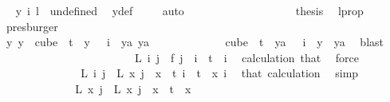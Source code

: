 \begin{isabellebody}
\ \isamarkupfalse%
\ {\isachardoublequoteopen}y\ i\ l\ {\isacharequal}{\kern0pt}\ undefined{\isachardoublequoteclose}\ \isamarkupfalse%
\ y{\isacharunderscore}{\kern0pt}def\ \isamarkupfalse%
\ {}\ \isamarkupfalse%
\ auto\isanewline
\ \ \ \ \ \ \ \ \ \ \ \ \ \ \ \ \isamarkupfalse%
\ \isamarkupfalse%
\ {\isacharquery}{\kern0pt}thesis\ \isamarkupfalse%
\ l{\isacharunderscore}{\kern0pt}prop\ \isamarkupfalse%
\ presburger\isanewline
\ \ \ \ \ \ \ \ \ \ \ \ \ \ \isamarkupfalse%
\isanewline
\ \ \ \ \ \ \ \ \ \ \ \ \isamarkupfalse%
\isanewline
\ \ \ \ \ \ \ \ \ \ \ \ \isamarkupfalse%
\ \isamarkupfalse%
\ {\isachardoublequoteopen}{\isasymexists}y{\isachardot}{\kern0pt}\ {\isacharparenleft}{\kern0pt}y\ {\isasymin}\ cube\ {}\ t\ {\isasymand}\ y\ {}\ {\isacharequal}{\kern0pt}\ i{\isacharparenright}{\kern0pt}\ {\isasymand}\ {\isacharparenleft}{\kern0pt}{\isasymforall}ya{\isachardot}{\kern0pt}\ ya\isanewline
\ \ \ \ \ \ \ \ \ \ \ \ {\isasymin}\ cube\ {}\ t\ {\isasymand}\ ya\ {}\ {\isacharequal}{\kern0pt}\ i\ {\isasymlongrightarrow}\ y\ {\isacharequal}{\kern0pt}\ ya{\isacharparenright}{\kern0pt}{\isachardoublequoteclose}\ \isamarkupfalse%
\ blast\isanewline
\isanewline
\ \ \ \ \ \ \ \ \ \ \isamarkupfalse%
\isanewline
\ \ \ \ \ \ \ \ \ \ \isamarkupfalse%
\ \isamarkupfalse%
\ {\isachardoublequoteopen}L\ i\ j\ {\isacharequal}{\kern0pt}\ f\ j{\isachardoublequoteclose}\ \ {\isachardoublequoteopen}i\ {\isacharless}{\kern0pt}\ t{\isachardoublequoteclose}\ \ i\ \isamarkupfalse%
\ calculation\ that\ \isamarkupfalse%
\ force\isanewline
\ \ \ \ \ \ \ \ \ \ \isamarkupfalse%
\ \isamarkupfalse%
\ \ {\isachardoublequoteopen}L\ i\ j\ {\isacharequal}{\kern0pt}\ L\ x\ j{\isachardoublequoteclose}\ \ {\isachardoublequoteopen}x\ {\isacharless}{\kern0pt}\ t{\isachardoublequoteclose}\ {\isachardoublequoteopen}i\ {\isacharless}{\kern0pt}\ t{\isachardoublequoteclose}\ \ x\ i\ \isamarkupfalse%
\ that\ calculation\ \isamarkupfalse%
\ simp\isanewline
\ \ \ \ \ \ \ \ \ \ \isamarkupfalse%
\ \isamarkupfalse%
\ {\isachardoublequoteopen}L{\isacharprime}{\kern0pt}\ x\ j\ {\isacharequal}{\kern0pt}\ L\ x\ j{\isachardoublequoteclose}\ \ {\isachardoublequoteopen}x\ {\isacharless}{\kern0pt}\ t{\isachardoublequoteclose}\ \ x\ \isamarkupfalse%

\end{isabellebody}
